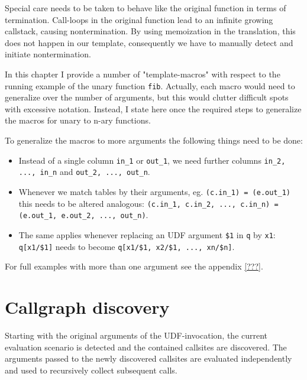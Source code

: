 Special care needs to be taken to behave like the original function in terms of termination. Call-loops in the original function lead to an infinite growing callstack, causing nontermination. By using memoization in the translation, this does not happen in our template, consequently we have to manually detect and initiate nontermination.

In this chapter I provide a number of "template-macros" with respect to the running example of the unary function \texttt{fib}. Actually, each macro would need to generalize over the number of arguments, but this would clutter difficult spots with excessive notation. Instead, I state here once the required steps to generalize the macros for unary to n-ary functions.

To generalize the macros to more arguments the following things need to be done:
\begin{itemize}
    \item Instead of a single column \texttt{in\_1} or \texttt{out\_1}, we need further columns \texttt{in\_2, ..., in\_n} and \texttt{out\_2, ..., out\_n}.
    \item Whenever we match tables by their arguments, eg. \texttt{(c.in\_1) = (e.out\_1)} this needs to be altered analogous: \texttt{(c.in\_1, c.in\_2, ..., c.in\_n) = (e.out\_1, e.out\_2, ..., out\_n)}.
    \item The same applies whenever replacing an UDF argument \texttt{\$1} in \texttt{q} by \texttt{x1}: \texttt{q[x1/\$1]} needs to become \texttt{q[x1/\$1, x2/\$1, ..., xn/\$n]}.
\end{itemize}

For full examples with more than one argument see the appendix \autoref{???}. 

\section{Callgraph discovery}

Starting with the original arguments of the UDF-invocation, the current evaluation scenario is detected and the contained callsites are discovered. The arguments passed to the newly discovered callsites are evaluated independently and used to recursively collect subsequent calls.

